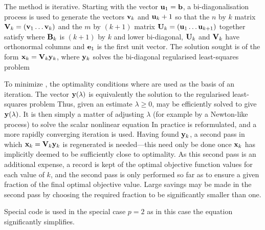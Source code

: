 \documentclass{galahad}
\begin{document}
\noindent 
The method is iterative. Starting  with the vector ${\mathbf{u}}_1 = {\mathbf{b}}$, a
bi-diagonalisation process is used to generate the vectors ${\mathbf{v}}_k$ and 
${\mathbf{u}}_k+1$ so that the $n$ by $k$ matrix ${\mathbf{V}}_k = ( {\mathbf{v}}_1 \ldots {\mathbf{v}}_k)$ 
and the $m$ by $(k+1)$ matrix ${\mathbf{U}}_k = ( {\mathbf{u}}_1 \ldots {\mathbf{u}}_{k+1})$ 
together satisfy
where ${\mathbf{B}}_k$ is $(k+1)$ by $k$ and lower bi-diagonal, ${\mathbf{U}}_k$ and 
${\mathbf{V}}_k$ have orthonormal columns and ${\mathbf{e}}_1$ is the first unit vector. 
The solution sought is of the form ${\mathbf{x}}_k = {\mathbf{V}}_k {\mathbf{y}}_k$, where ${\mathbf{y}}_k$
solves the bi-diagonal regularised least-squares problem

To minimize , the optimality conditions
where 
are used as the basis of an iteration. 
The vector ${\mathbf{y}}(\lambda)$ is equivalently the solution to the 
regularised least-squares problem 
Thus, given an estimate $\lambda \geq 0$,  may be efficiently 
solved to give ${\mathbf{y}}(\lambda)$. 
It is then simply a matter of adjusting $\lambda$ 
(for example by a Newton-like process) to solve the scalar nonlinear equation
In practice  is reformulated, and a more rapidly converging iteration is
used. Having found  ${\mathbf{y}}_k$, a second pass in which 
${\mathbf{x}}_k = {\mathbf{V}}_k {\mathbf{y}}_k$ is regenerated is needed---this need only be done
once ${\mathbf{x}}_k$ has implicitly deemed to be sufficiently close to optimality.
As this second pass is an additional expense, a record is kept of the 
optimal objective function values for each value of $k$, and the second 
pass is only performed so far as to ensure a given fraction of the 
final optimal objective value. Large savings may be made in the second 
pass by choosing the required fraction to be significantly smaller than one. 
 
Special code is used in the special case $p=2$ as in this case the
equation  significantly simplifies.
\end{document}
